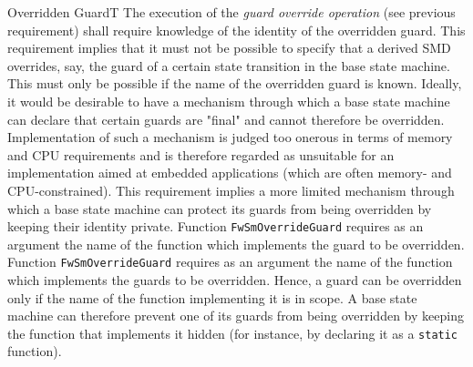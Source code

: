 \documentclass[a4paper,10pt]{article}
\newenvironment{fw_req_note}[7]
{\addtocounter{subsubsection}{1}
	\hspace{0.2cm}\textbf{FW-\arabic{section}.\arabic{subsection}.\arabic{subsubsection}/#2
	\hspace{0.8cm} #1}
	\vspace{-10pt}
\begin{longtable}{p{2.7cm}P{8.5cm}}
\hline
\textsc{Requirement} & #3 \\
\textsc{Note} & #4 \\
\textsc{Justification} & #5 \\
\textsc{Implementation} & #6  \\ 
\textsc{Verification} & #7  \\
\hline
}
{\end{longtable}}
\begin{document}
\begin{fw_req_note}{Overridden Guard}{T}
{The execution of the \emph{guard override operation} (see previous
requirement) shall require knowledge of the identity of the overridden guard.}
{This requirement implies that it must not be possible to specify that a derived 
SMD overrides, say, the guard of a certain state transition in the base state machine. 
This must only be possible if the name of the overridden guard is known.}
{Ideally, it would be desirable to have a mechanism through which a base 
state machine can declare that certain guards are "final" and cannot therefore be overridden. 
Implementation of such a mechanism is judged too onerous in terms of memory and CPU requirements 
and is therefore regarded as unsuitable for an implementation aimed at embedded applications 
(which are often memory- and CPU-constrained). 
This requirement implies a more limited mechanism through which a base state machine can protect 
its guards from being overridden by keeping their identity private.}
{Function \texttt{FwSmOverrideGuard} requires as an argument the name of 
the function which implements the guard to be overridden.} 
{Function \texttt{FwSmOverrideGuard} requires as an argument the name of 
the function which implements the guards to be overridden. 
Hence, a guard can be overridden only if the name of the function implementing it is in scope. 
A base state machine can therefore prevent one of its guards from being overridden by keeping 
the function that implements it hidden (for instance, by declaring it as a \texttt{static} 
function).}
\end{fw_req_note}
\end{document}
